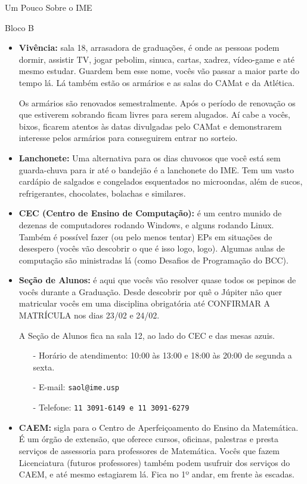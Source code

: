 \begin{secao}{Um Pouco Sobre o IME}
\begin{subsecao}{Bloco B}
\begin{itemize}
\item {\bf Vivência:} sala 18, arrasadora de graduações, é onde as pessoas podem
dormir, assistir TV, jogar pebolim, sinuca, cartas, xadrez, vídeo-game e até
mesmo estudar. Guardem bem esse nome, vocês vão passar a maior parte do tempo lá.
Lá também estão os armários e as salas do CAMat e da Atlética.

Os armários são renovados semestralmente. Após o período de renovação os que
estiverem sobrando ficam livres para serem alugados. Aí cabe a vocês, bixos, ficarem
atentos às datas divulgadas pelo CAMat e demonstrarem interesse pelos armários para
conseguirem entrar no sorteio.

\item {\bf Lanchonete:} Uma alternativa para os dias chuvosos que você está sem
  guarda-chuva para ir até o bandejão é a lanchonete do IME. Tem um vasto
  cardápio de salgados e congelados esquentados no microondas, além de sucos,
  refrigerantes, chocolates, bolachas e similares.

\item {\bf CEC (Centro de Ensino de Computação):} é um centro munido de dezenas
de computadores rodando Windows, e alguns rodando Linux. Também é possível fazer
(ou pelo menos tentar) EPs em situações de desespero (vocês vão descobrir o que é
isso logo, logo). Algumas aulas de computação são ministradas lá (como Desafios
de Programação do BCC).

\item {\bf Seção de Alunos:} é aqui que vocês vão resolver quase todos os pepinos
de vocês durante a Graduação. Desde descobrir por quê o Júpiter não quer matricular vocês
em uma disciplina obrigatória até CONFIRMAR A MATRÍCULA nos dias 23/02 e 24/02. %

A Seção de Alunos fica na sala 12, ao lado do CEC e das mesas azuis.
\begin{itemize}
\item[-] Horário de atendimento: 10:00 às 13:00 e 18:00 às 20:00 de segunda a sexta.
\item[-] E-mail: \tt{saol@ime.usp}
\item[-] Telefone: \tt{11 3091-6149} e \tt{11 3091-6279}
\end{itemize}

\item {\bf CAEM:} sigla para o Centro de Aperfeiçoamento do Ensino da Matemática.
É um órgão de extensão, que oferece cursos, oficinas, palestras e presta serviços
de assessoria para professores de Matemática. Vocês que fazem Licenciatura (futuros
professores) também podem usufruir dos serviços do CAEM, e até mesmo estagiarem lá.
Fica no 1º andar, em frente às escadas.


\end{itemize}
\end{subsecao}
\end{secao}
